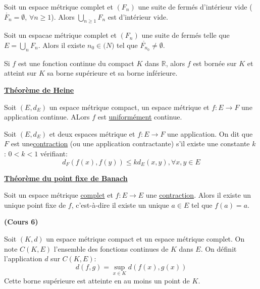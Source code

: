 \documentclass[12pt,a4paper]{article}
\begin{document}
\begin{flushleft}
\begin{cor}
Soit \edm un espace métrique complet et $(F_n)$ une suite de fermés d'intérieur vide ($\mathring{F_n} = \emptyset$, $\forall n \geq 1$). Alors  $\bigcup\limits_{n \geq 1} F_n$ est d'intérieur vide.
\end{cor}

\begin{cor}
Soit \edm un espacae métrique complet et $(F_n)$ une suite de fermés telle que $E = \bigcup\limits_{n} F_n$. Alors il existe $n_0 \in \mathbb(N)$ tel que $\mathring{F_{n_0}} \neq \emptyset$.
\end{cor}

\begin{thm}
Si $f$ est une fonction continue du compact $K$ dans $\mathbb{R}$, alors $f$ est bornée sur $K$ et atteint sur $K$ sa borne supérieure et sa borne inférieure.
 \end{thm}


\underline{\textbf{Théorème de Heine}}
\begin{thm}
Soit $(E,d_E)$ un espace métrique compact, \fdm un espace métrique et $f: E \longrightarrow F$ une application continue. ALors $f$ est \underline{uniformément} continue.
 \end{thm}

\begin{mydef}
Soit $(E,d_E)$ et \fdm deux espaces métrique et $f: E \longrightarrow F$ une application. On dit que $F$ est une\underline{contraction} (ou une application contractante) s'il existe une constante $k$ : $0 < k < 1$ vérifiant:
$$ d_F (f(x), f(y)) \leq k d_E (x,y), \forall x, y \in E$$
 \end{mydef}


\underline{\textbf{Théorème du point fixe de Banach}}
\begin{thm}
Soit \edm un espace métrique \underline{complet} et $f: E \longrightarrow E$ une \underline{contraction}. Alors il existe un unique point fixe de $f$, c'est-à-dire il existe un unique $a \in E$ tel que $f(a) = a$.
 \end{thm}



\textbf{(Cours 6)}


\begin{rem}
Soit $(K,d)$ un espace métrique compact et \edm un espace métrique complet. On note $C(K,E)$ l'ensemble des fonctions continues de $K$ dans $E$. On définit l'application $d$ sur $C(K,E) $: $$ d(f,g) = \sup\limits_{x \in K} d(f(x), g(x))$$ Cette borne  supérieure est atteinte en au moins un point de $K$.
\end{rem}


\end{flushleft}
\end{document}
